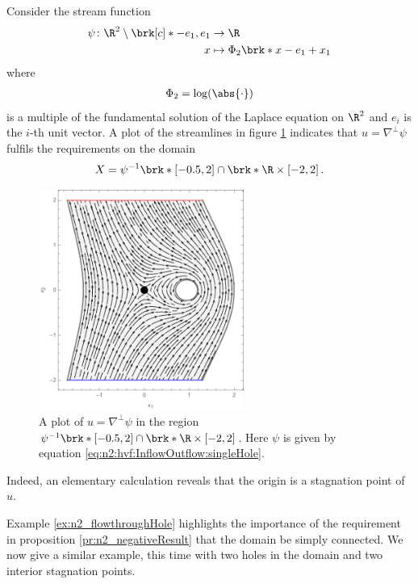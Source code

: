 \begin{example}\label{ex:n2_flowthroughHole}
  Consider the stream function
  \begin{equation}
    \begin{aligned}
    \psi\colon \R^2\setminus\brk[c]*{-e_1,e_1}&\to\R \\
    x&\mapsto\Phi_2\brk*{x-e_1}+x_1
    \end{aligned}\label{eq:n2:hvf:InflowOutflow:singleHole}
  \end{equation}
  where
  \begin{align}
    \Phi_2=\log(\abs{\cdot})\label{eq:n2_defPhi}
  \end{align}
  is a multiple of the fundamental solution of the Laplace equation on $\R^2$ and $e_i$ is the $i$-th unit vector.
  A plot of the streamlines in figure \ref{pl:n2_hvf_InflowOutflow_asymmetric_single} indicates that $u=\nabla^\perp\psi$ fulfils the
  requirements on the domain
  $$X=\psi^{-1}\brk*{[-0.5,2]}\cap \brk*{\R\times[-2,2]}\,.$$
  \begin{figure}
    \centering
    \includegraphics[width=0.6\textwidth]{../Plots/n2_hvf_InflowOutflow_asymmetric_gray_2.pdf}
    \caption{A plot of $u=\nabla^\perp\psi$ in the region $\psi^{-1}\brk*{[-0.5,2]}\cap \brk*{\R\times[-2,2]}$.
    Here $\psi$ is given by equation \eqref{eq:n2:hvf:InflowOutflow:singleHole}.}
    \label{pl:n2_hvf_InflowOutflow_asymmetric_single}
  \end{figure}
  Indeed, an elementary calculation reveals that the origin is a stagnation point of $u$.
\end{example}
Example \ref{ex:n2_flowthroughHole} highlights the importance of the requirement in proposition \ref{pr:n2_negativeResult} that the domain be simply connected.
We now give a similar example, this time with two holes in the domain and two interior stagnation points.

